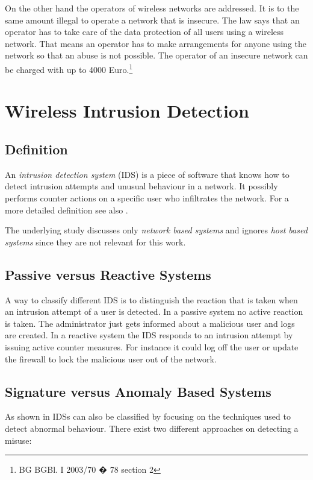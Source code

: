 On the other hand the operators of wireless networks are addressed. It is to the same amount illegal to operate a network that is insecure. The law says that an operator has to take care of the data protection of all users using a wireless network. That means an operator has to make arrangements for anyone using the network so that an abuse is not possible. The operator of an insecure network can be charged with up to 4000 Euro.\footnote{BG BGBl. I 2003/70 � 78 section 2}


\chapter{Wireless Intrusion Detection}

\section{Definition}
\label{sec:wids_definition}

An {\em intrusion detection system} (IDS) is a piece of software that knows how to detect intrusion attempts and unusual behaviour in a network. It possibly performs counter actions on a specific user who infiltrates the network. For a more detailed definition see also \cite{idsdef}.

The underlying study discusses only {\em network based systems} and ignores {\em host based systems} since they are not relevant for this work.

\section{Passive versus Reactive Systems}

A way to classify different IDS is to distinguish the reaction that is taken when an intrusion attempt of a user is detected. In a passive system no active reaction is taken. The administrator just gets informed about a malicious user and logs are created. In a reactive system the IDS responds to an intrusion attempt by issuing active counter measures. For instance it could log off the user or update the firewall to lock the malicious user out of the network.

\section{Signature versus Anomaly Based Systems}
\label{sec:sig_anom_ids}

As shown in \cite{idsdef} IDSs can also be classified by focusing on the techniques used to detect abnormal behaviour. There exist two different approaches on detecting a misuse:

